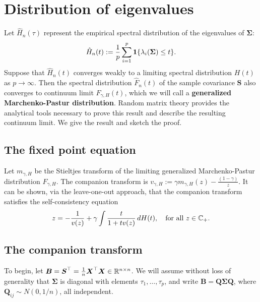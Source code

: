 \documentclass{article}
\newcommand{\bX}{\boldsymbol{X}}
\newcommand{\bSigma}{\boldsymbol{\Sigma}}
\newcommand{\bS}{\boldsymbol{S}}
\newcommand{\bB}{\boldsymbol{B}}
\newcommand{\bQ}{\boldsymbol{Q}}
\begin{document}
\section{Distribution of eigenvalues}
Let $\hat{H}_n(\tau)$ represent the empirical spectral distribution of the eigenvalues of $\bSigma$:
$$
\hat{H}_n(t) := \frac{1}{p} \sum_{i = 1}^{p} \1\{\lambda_i(\bSigma) \leq t\}.
$$
Suppose that $\hat{H}_n(t)$ converges weakly to a limiting spectral distribution $H(t)$ as $p \to \infty$. Then the spectral distribution $\hat{F}_n(t)$ of the sample covariance $\bS$ also converges to continuum limit $F_{\gamma,H}(t)$, which we will call a {\bf generalized Marchenko-Pastur distribution}. Random matrix theory provides the analytical tools necessary to prove this result and describe the resulting continuum limit. We give the result and sketch the proof.

\subsection{The fixed point equation}
Let $m_{\gamma,H}$ be the Stieltjes transform of the limiting generalized Marchenko-Pastur distribution $F_{\gamma,H}$. The companion transform is $v_{\gamma,H} := \gamma m_{\gamma,H}(z) - \frac{(1 - \gamma)}{z}$. It can be shown, via the leave-one-out approach, that the companion transform satisfies the self-consistency equation
\begin{equation}
	\label{eqn:silverstein}
	z = -\frac{1}{v(z)} + \gamma \int \frac{t}{1 + tv(z)} \,dH(t), \quad \textrm{for all $z \in \mathbb{C}_{+}$.}
\end{equation}

\subsection{The companion transform}
To begin, let $\bB = \bS^{\top} = \frac{1}{n} \bX^{\top} \bX \in \Reals^{n \times n}$. We will assume without loss of generality that $\bSigma$ is diagonal with elements $\tau_1,\ldots,\tau_p$, and write $\bB = \bQ \bSigma \bQ$, where $\bQ_{ij} \sim N(0,1/n)$, all independent. 
\end{document}
